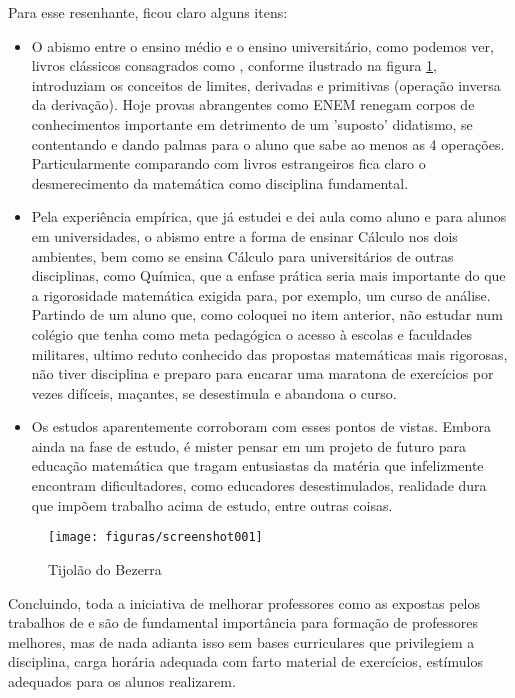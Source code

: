 \documentclass[
	12pt,				%
	openright,			%
	oneside,
	a4paper,			%
	chapter=TITLE,		%
	section=TITLE,		%
	sumario=abnt-6027-2012,
	english,			%
	brazil				%
]{abntex2}
\begin{document}
	Para esse resenhante, ficou claro alguns itens:
	\begin{itemize}
		\item O abismo entre o ensino médio e o ensino universitário, como podemos ver, livros clássicos consagrados como , conforme ilustrado na figura \ref{fig:screenshot001}, introduziam os conceitos de limites, derivadas e primitivas (operação inversa da derivação). Hoje provas abrangentes como ENEM renegam corpos de conhecimentos importante em detrimento de um 'suposto' didatismo, se contentando e dando palmas para o aluno que sabe ao menos as 4 operações. Particularmente comparando com livros estrangeiros fica claro o desmerecimento da matemática como disciplina fundamental.
		
		\item Pela experiência empírica, que já estudei e dei aula como aluno e para alunos em universidades, o abismo entre a forma de ensinar Cálculo nos dois ambientes, bem como se ensina Cálculo para universitários de outras disciplinas, como Química, que a enfase prática seria mais importante do que a rigorosidade matemática exigida para, por exemplo, um curso de análise. Partindo de um aluno que, como coloquei no item anterior, não estudar num colégio que tenha como meta pedagógica o acesso à escolas e faculdades militares, ultimo reduto conhecido das propostas matemáticas mais rigorosas, não tiver disciplina e preparo para encarar uma maratona de exercícios por vezes difíceis, maçantes, se desestimula e abandona o curso.
		
		\item Os estudos aparentemente corroboram com esses pontos de vistas. Embora ainda na fase de estudo, é mister pensar em um projeto de futuro para educação matemática que tragam entusiastas da matéria que infelizmente encontram dificultadores, como educadores desestimulados, realidade dura que impõem trabalho acima de estudo, entre outras coisas.
		
		
	\end{itemize}

	\begin{figure}[!bh]
		\centering
		\texttt{[image: figuras/screenshot001]}
		\caption[Tijolão do Bezerra]{Tijolão do Bezerra}
		\label{fig:screenshot001}
	\end{figure}
	
	Concluindo, toda a iniciativa de melhorar professores como as expostas pelos trabalhos de   e  são de fundamental importância para formação de professores melhores, mas de nada adianta isso sem bases curriculares que privilegiem a disciplina, carga horária adequada com farto material de exercícios, estímulos adequados para os alunos realizarem.
	
\end{document}

